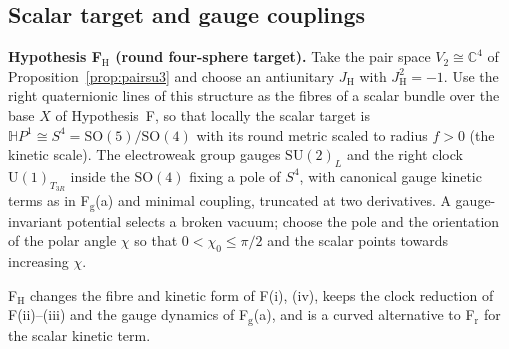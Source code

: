 \documentclass[aps,pra,onecolumn,superscriptaddress,nofootinbib,10pt]{revtex4-2}
\theoremstyle{definition}
\theoremstyle{remark}
\newcommand{\C}{\mathbb{C}}
\newcommand{\HH}{\mathbb{H}}
\newcommand{\SU}{\mathrm{SU}}
\newcommand{\SO}{\mathrm{SO}}
\newcommand{\U}{\mathrm{U}}
\begin{document}
\subsection{Scalar target and gauge couplings}

\smallskip\noindent\textbf{Hypothesis F$_{\mathrm H}$ (round four-sphere target).}  Take the pair space $V_2\cong\C^4$ of
Proposition~\ref{prop:pairsu3} and choose an antiunitary $J_{\mathrm H}$ with $J_{\mathrm H}^2=-1$.  Use the right quaternionic lines of this
structure as the fibres of a scalar bundle over the base $X$ of Hypothesis~F, so that locally the scalar target
is $\HH P^1\cong S^4=\SO(5)/\SO(4)$ with its round metric scaled to radius $f>0$ (the kinetic scale).  The electroweak group
gauges $\SU(2)_L$ and the right clock $\U(1)_{T_{3R}}$ inside the $\SO(4)$ fixing a pole of $S^4$, with canonical gauge kinetic
terms as in F$_{\mathrm g}$(a) and minimal coupling, truncated at two derivatives.  A gauge-invariant potential
selects a broken vacuum; choose the pole and the orientation of the polar angle $\chi$ so that $0<\chi_0\le\pi/2$ and the
scalar points towards increasing $\chi$.

\noindent F$_{\mathrm H}$ changes the fibre and kinetic form of F(i), (iv), keeps the clock reduction of F(ii)--(iii) and the
gauge dynamics of F$_{\mathrm g}$(a), and is a curved alternative to F$_{\mathrm r}$ for the scalar kinetic term.
\end{document}
